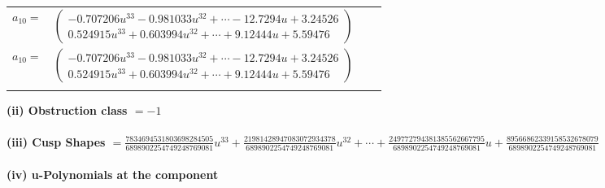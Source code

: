 \documentclass[1p]{elsarticle_modified}
\theoremstyle{definition}
\begin{document}
\begin{tabular}{m{7pt} m{180pt} m{7pt} m{180pt} }
\flushright $a_{10}=$&$\begin{pmatrix}-0.707206 u^{33}-0.981033 u^{32}+\cdots-12.7294 u+3.24526\\0.524915 u^{33}+0.603994 u^{32}+\cdots+9.12444 u+5.59476\end{pmatrix}$\\ \flushright $a_{10}=$&$\begin{pmatrix}-0.707206 u^{33}-0.981033 u^{32}+\cdots-12.7294 u+3.24526\\0.524915 u^{33}+0.603994 u^{32}+\cdots+9.12444 u+5.59476\end{pmatrix}$\\&\end{tabular}
\flushleft \textbf{(ii) Obstruction class $= -1$}\\~\\
\flushleft \textbf{(iii) Cusp Shapes $= \frac{7834694531803698284505}{6898902254749248769081} u^{33}+\frac{21981428947083072934378}{6898902254749248769081} u^{32}+\cdots+\frac{249772794381385562667795}{6898902254749248769081} u+\frac{89566862339158532678079}{6898902254749248769081}$}\\~\\
\newpage\renewcommand{\arraystretch}{1}
\flushleft \textbf{(iv) u-Polynomials at the component}\newline \\
\end{document}
